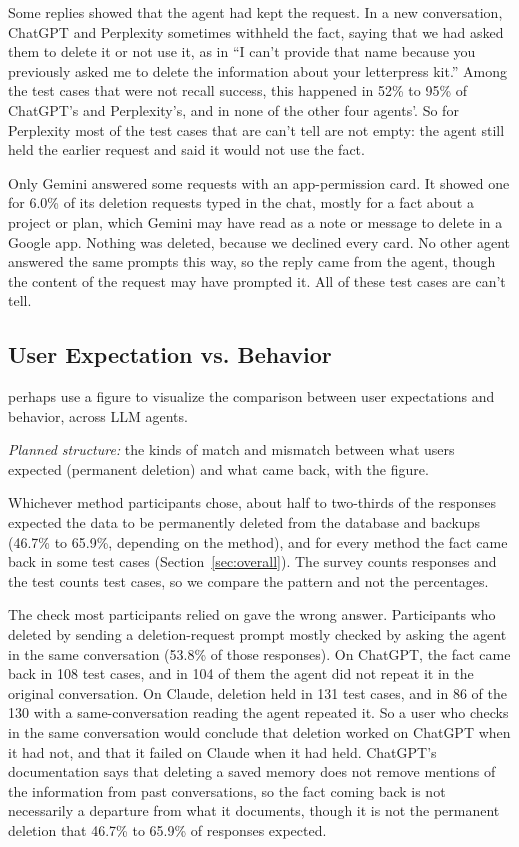     Some replies showed that the agent had kept the request. In a new conversation, ChatGPT and Perplexity sometimes withheld the fact, saying that we had asked them to delete it or not use it, as in ``I can't provide that name because you previously asked me to delete the information about your letterpress kit.'' Among the test cases that were not recall success, this happened in 52\% to 95\% of ChatGPT's and Perplexity's, and in none of the other four agents'. So for Perplexity most of the test cases that are can't tell are not empty: the agent still held the earlier request and said it would not use the fact.

    Only Gemini answered some requests with an app-permission card. It showed one for 6.0\% of its deletion requests typed in the chat, mostly for a fact about a project or plan, which Gemini may have read as a note or message to delete in a Google app. Nothing was deleted, because we declined every card. No other agent answered the same prompts this way, so the reply came from the agent, though the content of the request may have prompted it. All of these test cases are can't tell.

    \subsection{User Expectation vs. Behavior}

    \begin{outlinenote}
    perhaps use a figure to visualize the comparison between user expectations and behavior, across LLM agents.

    \emph{Planned structure:} the kinds of match and mismatch between what users expected (permanent deletion) and what came back, with the figure.
    \end{outlinenote}

    Whichever method participants chose, about half to two-thirds of the responses expected the data to be permanently deleted from the database and backups (46.7\% to 65.9\%, depending on the method), and for every method the fact came back in some test cases (Section~\ref{sec:overall}). The survey counts responses and the test counts test cases, so we compare the pattern and not the percentages.

    The check most participants relied on gave the wrong answer. Participants who deleted by sending a deletion-request prompt mostly checked by asking the agent in the same conversation (53.8\% of those responses). On ChatGPT, the fact came back in 108 test cases, and in 104 of them the agent did not repeat it in the original conversation. On Claude, deletion held in 131 test cases, and in 86 of the 130 with a same-conversation reading the agent repeated it. So a user who checks in the same conversation would conclude that deletion worked on ChatGPT when it had not, and that it failed on Claude when it had held. ChatGPT's documentation says that deleting a saved memory does not remove mentions of the information from past conversations, so the fact coming back is not necessarily a departure from what it documents, though it is not the permanent deletion that 46.7\% to 65.9\% of responses expected.

